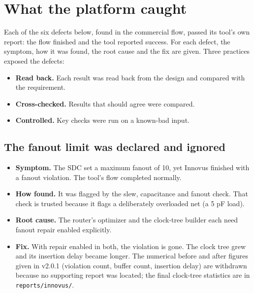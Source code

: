 \documentclass[11pt,letterpaper]{article}
\newcommand{\sk}[1]{\texttt{#1}}
\renewcommand{\_}{\textunderscore\penalty0\hskip0pt\relax}
\begin{document}
\section{What the platform caught}\label{sec:caught}
Each of the six defects below, found in the commercial flow, passed its tool's own report: the flow finished and the tool reported success. For each defect, the symptom, how it was found, the root cause and the fix are given. Three practices exposed the defects:
\begin{itemize}
\item \textbf{Read back.} Each result was read back from the design and compared with the requirement.
\item \textbf{Cross-checked.} Results that should agree were compared.
\item \textbf{Controlled.} Key checks were run on a known-bad input.
\end{itemize}

\subsection{The fanout limit was declared and ignored}
\begin{itemize}
\item \textbf{Symptom.} The SDC set a maximum fanout of 10, yet Innovus finished with a fanout violation. The tool's flow completed normally.
\item \textbf{How found.} It was flagged by the slew, capacitance and fanout check. That check is trusted because it flags a deliberately overloaded net (a 5 pF load).
\item \textbf{Root cause.} The router's optimizer and the clock-tree builder each need fanout repair enabled explicitly.
\item \textbf{Fix.} With repair enabled in both, the violation is gone. The clock tree grew and its insertion delay became longer. The numerical before and after figures given in v2.0.1 (violation count, buffer count, insertion delay) are withdrawn because no supporting report was located; the final clock-tree statistics are in \sk{reports/innovus/}.
\end{itemize}
\end{document}
